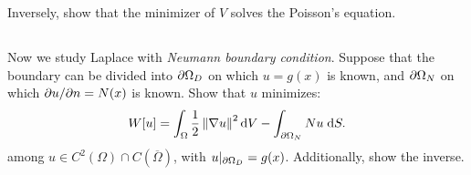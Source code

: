\documentclass[11pt,letterpaper]{article}
\begin{document}
Inversely, show that the minimizer of $V$ solves the Poisson's equation.

\subsection{}
Now we study Laplace with \emph{Neumann boundary condition}. Suppose that the boundary can be divided into $\partial\Omega_D$ on which $u = g(x)$ is known, and $\partial\Omega_N$ on
which $\partial u/\partial n = N(x)$ is known. Show that $u$ minimizes:
\begin{align}
    W[u] = \int_\Omega \frac{1}{2}\left\Vert \nabla u \right\Vert^2\mathrm{d} V-\int_{\partial\Omega_N} Nu\;\mathrm{d} S. 
\end{align}
among $u\in C^2(\Omega)\cap C(\overline{\Omega})$, with $u|_{\partial\Omega_D} = g(x)$. Additionally, show the inverse.




\vfill
\printbibliography
\end{document}
